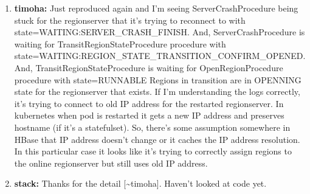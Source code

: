 \documentclass{report}%
\begin{document}
\begin{enumerate}
\begin{lstlisting}[language=java]
java.net.ConnectException: Call to regionserver-1.hbase.hbase.svc.cluster.local/10.128.9.13:16020 failed on connection exception: org.apache.hbase.thirdparty.io.netty.channel.AbstractChannel$AnnotatedConnectException: finishConnect(..) failed: No route to host:
 regionserver-1.hbase.hbase.svc.cluster.local/10.128.9.13:16020\end{lstlisting} \ \newline%
\newline%
These errors happen every 2 seconds (which is the default expiry of failed servers)%
\item%
\textbf{timoha: }Just reproduced again and I'm seeing ServerCrashProcedure being stuck for the regionserver that it's trying to reconnect to with state=WAITING:SERVER\_CRASH\_FINISH.\newline%
\newline%
\newline%
\newline%
And, ServerCrashProcedure is waiting for TransitRegionStateProcedure procedure with state=WAITING:REGION\_STATE\_TRANSITION\_CONFIRM\_OPENED.\newline%
\newline%
And, TransitRegionStateProcedure is waiting for OpenRegionProcedure procedure with state=RUNNABLE\newline%
\newline%
\newline%
\newline%
Regions in transition are in OPENNING state for the regionserver that exists.\newline%
\newline%
\newline%
\newline%
If I'm understanding the logs correctly, it's trying to connect to old IP address for the restarted regionserver. In kubernetes when pod is restarted it gets a new IP address and preserves hostname (if it's a statefulset). So, there's some assumption somewhere in HBase that IP address doesn't change or it caches the IP address resolution. In this particular case it looks like it's trying to correctly assign regions to the online regionserver but still uses old IP address.%
\item%
\textbf{stack: }Thanks for the detail {[}\textasciitilde{}timoha{]}. Haven't looked at code yet.\newline%
\newline%
\newline%
\newline%

\end{enumerate}
\end{document}

